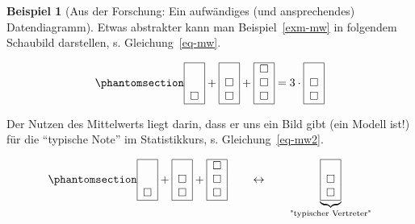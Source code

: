 \documentclass[
  a4paper,
]{scrbook}
\theoremstyle{definition}
\newtheorem{example}{Beispiel}[chapter]
\theoremstyle{definition}
\theoremstyle{definition}
\theoremstyle{remark}
\begin{document}
\begin{example}[Aus der Forschung: Ein aufwändiges (und ansprechendes)
Datendiagramm]
Etwas abstrakter kann man Beispiel~\ref{exm-mw} in folgendem Schaubild
darstellen, s. Gleichung~\ref{eq-mw}.

\begin{equation}\phantomsection\label{eq-mw}{
\begin{array}{|c|} \hline \\ \\ \square \\ \hline \end{array} + \begin{array}{|c|} \hline \\ \square \\ \square \\ \hline \end{array} + \begin{array}{|c|} \hline \square \\ \square \\ \square \\ \hline \end{array} = 3 \cdot \begin{array}{|c|} \hline \\ \square \\ \square \\ \hline \end{array}
}\end{equation}

Der Nutzen des Mittelwerts liegt darin, dass er uns ein Bild gibt (ein
Modell ist!) für die ``typische Note'' im Statistikkurs, s.
Gleichung~\ref{eq-mw2}.

\begin{equation}\phantomsection\label{eq-mw2}{\begin{array}{|c|} \hline \\ \\ \square \\ \hline \end{array} + \begin{array}{|c|} \hline \\ \square \\ \square \\ \hline \end{array} + \begin{array}{|c|} \hline \square \\ \square \\ \square \\ \hline \end{array} \qquad \leftrightarrow  \qquad \underbrace{\begin{array}{|c|} \hline \\ \square \\ \square \\ \hline \end{array}}_{\text{"typischer Vertreter"}}}\end{equation}


\end{example}
\end{document}
